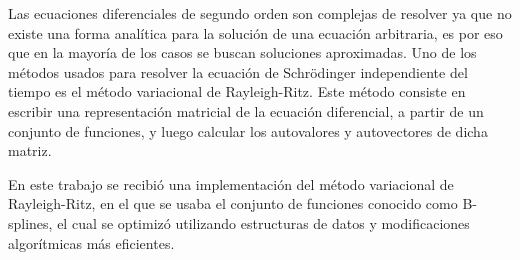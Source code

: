 \documentclass[a4paper,openright,12pt, oneside]{book}
\begin{document}
Las ecuaciones diferenciales de segundo orden son complejas de resolver ya que no existe una forma anal\'itica para la soluci\'on de una ecuaci\'on arbitraria, es por eso que en la mayor\'ia de los casos se buscan soluciones aproximadas. Uno de los m\'etodos usados para resolver la ecuaci\'on de Schr\"odinger independiente del tiempo es el m\'etodo variacional de Rayleigh-Ritz. Este m\'etodo consiste en escribir una representaci\'on matricial de la ecuaci\'on diferencial, a partir de un conjunto de funciones, y luego calcular los autovalores y autovectores de dicha matriz.

En este trabajo se recibi\'o una implementaci\'on del m\'etodo variacional de Rayleigh-Ritz, en el que se usaba el conjunto de funciones conocido como B-splines, el cual se optimiz\'o utilizando estructuras de datos y modificaciones algor\'itmicas m\'as eficientes.


\tableofcontents %



\setcounter{section}{0}


\setcounter{section}{0}


\setcounter{section}{0}


\setcounter{section}{0}


\setcounter{section}{0}

\end{document}
